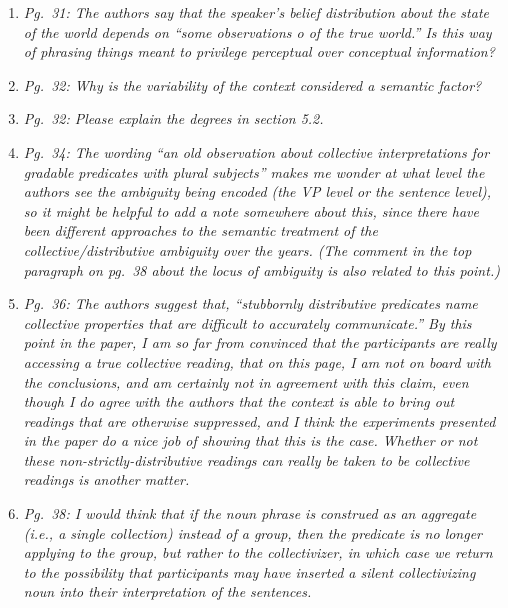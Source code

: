 \documentclass[12pt]{article}
\begin{document}
\begin{enumerate}
\item \emph{Pg.~31: The authors say that the speaker's belief distribution about the state of the world depends on ``some observations o of the true world.'' Is this way of phrasing things meant to privilege perceptual over conceptual information?}

\item \emph{Pg.~32: Why is the variability of the context considered a semantic factor?} 

\item \emph{Pg.~32: Please explain the degrees in section 5.2.}

\item \emph{Pg.~34: The wording ``an old observation about collective interpretations for gradable predicates with plural subjects'' makes me wonder at what level the authors see the ambiguity being encoded (the VP level or the sentence level), so it might be helpful to add a note somewhere about this, since there have been different approaches to the semantic treatment of the collective/distributive ambiguity over the years. (The comment in the top paragraph on pg.~38 about the locus of ambiguity is also related to this point.)}

\item \emph{Pg.~36: The authors suggest that, ``stubbornly distributive predicates name collective properties that are difficult to accurately communicate.'' By this point in the paper, I am so far from convinced that the participants are really accessing a true collective reading, that on this page, I am not on board with the conclusions, and am certainly not in agreement with this claim, even though I do agree with the authors that the context is able to bring out readings that are otherwise suppressed, and I think the experiments presented in the paper do a nice job of showing that this is the case. Whether or not these non-strictly-distributive readings can really be taken to be collective readings is another matter.}

\item \emph{Pg.~38: I would think that if the noun phrase is construed as an aggregate (i.e., a single collection) instead of a group, then the predicate is no longer applying to the group, but rather to the collectivizer, in which case we return to the possibility that participants may have inserted a silent collectivizing noun into their interpretation of the sentences.}

\end{enumerate}
\end{document}
